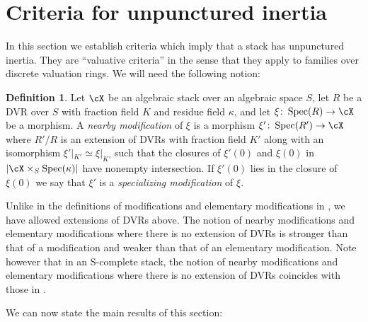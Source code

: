\documentclass[a4paper]{amsart}
\numberwithin{equation}{section}
\theoremstyle{plain}
\theoremstyle{definition}
\newtheorem{defn}[thm]{Definition}
\DeclareMathOperator{\Spec}{Spec}
\newcommand{\co}{\colon}
\begin{document}

\section{Criteria for unpunctured inertia} \label{S:unpunctured}

In this section we establish criteria which imply that a stack has unpunctured inertia. They are ``valuative criteria'' in the sense that they apply to families over discrete valuation rings. We will need the following notion:

\begin{defn} \label{D:nearby_modification}
Let $\cX$ be an algebraic stack over an algebraic space $S$, let $R$ be a DVR over $S$ with fraction field $K$ and residue field $\kappa$, and let $\xi \co \Spec(R) \to \cX$ be a morphism.  A {\em nearby modification} of $\xi$ is a morphism $\xi' \co \Spec(R') \to \cX$ where $R'/R$ is an extension of DVRs with fraction field $K'$ along with an isomorphism $\xi'|_{K'} \simeq \xi|_{K'}$ such that the closures of $\xi'(0)$ and $\xi(0)$ in $|\cX \times_{S} \Spec(\kappa)|$ have nonempty intersection. If $\xi'(0)$ lies in the closure of $\xi(0)$ we say that $\xi'$ is a {\em specializing modification} of $\xi$.
\end{defn}

Unlike in the definitions of modifications and elementary modifications in , we have allowed extensions of DVRs above. The notion of nearby modifications and elementary modifications where there is no extension of DVRs is stronger than that of a modification and weaker than that of an elementary modification.  Note however that in an  {\textsf{S}}-complete stack, the notion of nearby modifications and elementary modifications where there is no extension of DVRs coincides with those in .


We can now state the main results of this section:
\end{document}
